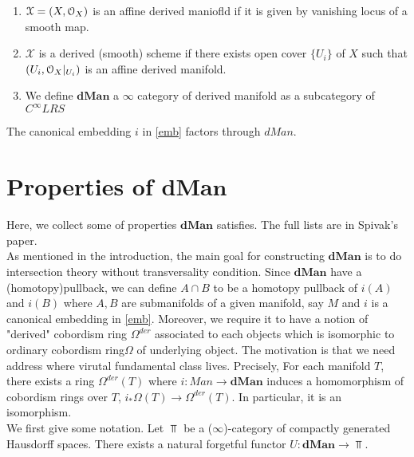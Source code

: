 \begin{defin}
    \begin{enumerate}
    \item $\mathcal{X}=(X, \mathcal O_X)$ is an affine derived maniofld if it is given by vanishing locus of a smooth map.
    \item $\mathcal{X}$ is a derived (smooth) scheme if there exists open cover $\{U_i\}$ of $X$ such that $(U_i, \mathcal O_X|_{U_i})$ is an affine derived manifold.
    \item We define $\textbf{dMan}$ a $\infty$ category of derived manifold as a subcategory of $C^{\infty}LRS$
    \end{enumerate}
\end{defin}

\begin{thm}
    The canonical embedding $i$ in \ref{emb} factors through $dMan$.
\end{thm}

\section{Properties of $\textbf{dMan}$}
Here, we collect some of properties $\textbf{dMan}$ satisfies. The full lists are in Spivak's paper.\\
As mentioned in the introduction, the main goal for constructing $\textbf{dMan}$ is to do intersection theory without transversality condition. Since $\textbf{dMan}$ have a (homotopy)pullback, we can define $A \cap B$ to be a homotopy pullback of $i(A)$ and $i(B)$ where $A, B$ are submanifolds of a given manifold, say $M$ and $i$ is a canonical embedding in \ref{emb}. Moreover, we require it to have a notion of "derived" cobordism ring $\Omega^{der}$ associated to each objects which is isomorphic to ordinary cobordism ring$\Omega$ of underlying object. The motivation is that we need address where virutal fundamental class lives. Precisely, For each manifold $T$, there exists a ring $\Omega^{der}(T)$ where $i:Man \to \textbf{dMan}$ induces a homomorphism of cobordism rings over $T$, $i_*\Omega(T) \to \Omega^{der}(T)$. In particular, it is an isomorphism.\\

We first give some notation. Let $\Top$ be a ($\infty$)-category of compactly generated Hausdorff spaces. There exists a natural forgetful functor $U:\textbf{dMan} \to \Top$.

